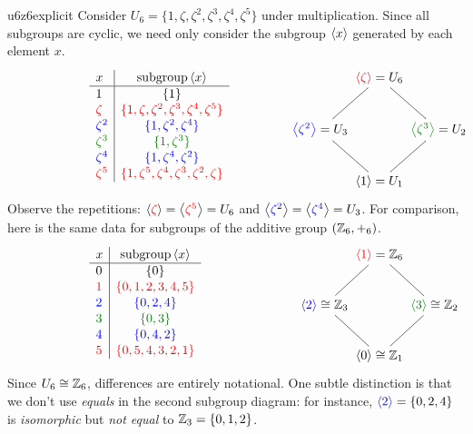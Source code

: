 \begin{example}{}{u6z6explicit}
	Consider $U_6=\{1,\zeta,\zeta^2,\zeta^3,\zeta^4,\zeta^5\}$ under multiplication. Since all subgroups are cyclic, we need only consider the subgroup $\left\langle x\right\rangle$ generated by each element $x$.
	\[
		\makebox[230pt][l]{%
			$\def\arraystretch{1.05}
			\begin{array}[t]{l|c}
				x & \text{subgroup}\ip x\\ \hline
				1 & \{1 \} \\
				\textcolor{red}{\zeta} & \textcolor{red}{\{1,\zeta,\zeta^2,\zeta^3,\zeta^4,\zeta^5\}}\\
				\textcolor{blue}{\zeta^2} & \textcolor{blue}{\{1,\zeta^2,\zeta^4\}}\\
				\textcolor{Green}{\zeta^3} & \textcolor{Green}{\{1,\zeta^3\}}\\
				\textcolor{blue}{\zeta^4} & \textcolor{blue}{\{1,\zeta^4,\zeta^2\}}\\
				\textcolor{red}{\zeta^5} & \textcolor{red}{\{1,\zeta^5,\zeta^4,\zeta^3,\zeta^2,\zeta\}}
			\end{array}$
		}
		\makebox[0pt][c]{%
			$\xymatrix @C0pt @R24pt{%
				& \textcolor{red}{\ip{\zeta}}=U_6 \ar@{-}[dl] \ar@{-}[dr] & \\
				\textcolor{blue}{\ip{\zeta^2}}=U_3 \ar@{-}[dr] & & \textcolor{Green}{\ip{\zeta^3}}=U_2 \ar@{-}[dl] \\
				& \ip{1}=U_1 &
			}$
		}
	\]
	Observe the repetitions: $\left\langle \textcolor{red}{\zeta}\right\rangle=\left\langle \textcolor{red}{\zeta^5}\right\rangle=U_6$ and $\left\langle \textcolor{blue}{\zeta^2}\right\rangle=\left\langle \textcolor{blue}{\zeta^4}\right\rangle=U_3$.
	\smallbreak
	For comparison, here is the same data for subgroups of the additive group $(\mathbb{Z}_6,+_6)$.
	\[
		\makebox[230pt][l]{%
			$\def\arraystretch{1.05}
			\begin{array}[t]{l|c}
				x & \text{subgroup}\ip x\\ \hline
				0 & \{0\} \\
				\textcolor{red}{1} & \textcolor{red}{\{0,1,2,3,4,5\}}\\
				\textcolor{blue}{2} & \textcolor{blue}{\{0,2,4\}}\\
				\textcolor{Green}{3} & \textcolor{Green}{\{0,3\}}\\
				\textcolor{blue}{4} & \textcolor{blue}{\{0,4,2\}}\\
				\textcolor{red}{5} & \textcolor{red}{\{0,5,4,3,2,1\}}
			\end{array}$
		}
	\makebox[0pt][c]{%
		$\xymatrix @C0pt @R24pt{%
			& \textcolor{red}{\ip{1}}=\Z_6 \ar@{-}[dl] \ar@{-}[dr] & \\
			\textcolor{blue}{\ip{2}}\cong\Z_3 \ar@{-}[dr] & & \textcolor{Green}{\ip{3}}\cong\Z_2 \ar@{-}[dl] \\
			& \ip{0}\cong\Z_1 &
			}$
		}
	\]
	Since $U_6\cong\mathbb{Z}_6$, differences are entirely notational. One subtle distinction is that we don't use \emph{equals} in the second subgroup diagram: for instance, $\textcolor{blue}{\left\langle 2\right\rangle}=\{0,2,4\}$ is \emph{isomorphic} but \emph{not equal} to $\mathbb{Z}_3=\{0,1,2\}$.
\end{example}

